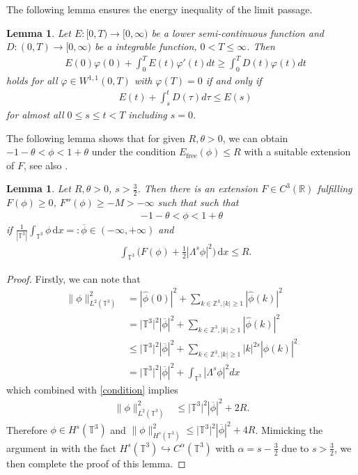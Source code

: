 \documentclass[reqno,a4paper,11pt]{amsart}
\theoremstyle{plain}
\newtheorem{lemma}[theorem]{Lemma}
\numberwithin{equation}{section}
\newcommand{\bb}[1]{\mathbb{#1}}
\newcommand{\bbt}{\bb{T}}
\renewcommand{\d}{\mathrm{d}}
\newcommand{\dx}{\d x}
\newcommand{\absm}[1]{\vert #1 \vert}
\begin{document}
The following lemma ensures the energy inequality of the limit passage.
\begin{lemma}\label{lem4}\cite{AH}
	Let $E:[0,T)\rightarrow[0,\infty)$ be a lower semi-continuous function and $D:(0,T)\rightarrow [0,\infty)$ be a integrable function, $0<T\leq\infty$. Then
	\begin{align*}
		&E(0)\varphi(0)+\int_0^{T}E(t)\varphi '(t)dt\geq \int_0^{T}D(t)\varphi(t)dt
	\end{align*}
	holds for all $\varphi\in W^{1,1}(0,T)$ with $\varphi(T)=0$ if and only if
	\begin{align*}
		&E(t)+\int_s^{t}D(\tau)d\tau\leq E(s)
	\end{align*}
	for almost all $0\leq s\leq t<T$ including $s=0$.
\end{lemma}
The following lemma shows that for given $R,\theta>0$, we can obtain $-1-\theta<\phi<1+\theta$ under the condition $E_{\text{free}}(\phi)\leq R$ with a suitable extension of $F$, see also \cite{AH}.
\begin{lemma}\label{lem2}
	Let $R,\theta>0$, $s>\frac{3}{2}$. Then there is an extension $F\in C^{3}(\mathbb{R})$ fulfilling $F(\phi)\geq0$, $F''(\phi)\geq -M> -\infty$ such that such that 
	\begin{align*}
		-1-\theta<\phi<1+\theta
	\end{align*}
	if $ \frac{1}{|\bbt^3|} \int_{\bbt^3} \phi \,\dx=:\overline{\phi} \in(-\infty,+\infty)$  and 
	\begin{align}
		& \int_{\mathbb{T}^{3}}\Big( F(\phi)+\frac{1}{2}|\Lambda^{s} \phi|^2\Big)\, \mathrm dx\leq R.\label{condition}
	\end{align}
\end{lemma}
\begin{proof}
	Firstly, we can note  that
	\begin{align*} \|\phi\|^2_{L^{2}(\mathbb{T}^{3})}&=|\hat{\phi}(0)|^2+\sum_{k\in \mathbb{Z}^3,|k|\geq 1}|\hat{\phi}(k)|^2
		\\&=\absm{\bbt^3}^2|\overline{\phi}|^{2}+\sum_{k\in \mathbb{Z}^3,|k|\geq 1}|\hat{\phi}(k)|^2
		\\&\leq \absm{\bbt^3}^2|\overline{\phi}|^{2}+\sum_{k\in \mathbb{Z}^3,|k|\geq 1}|k|^{2s}|\hat{\phi}(k)|^2
		\\&= \absm{\bbt^3}^2|\overline{\phi}|^{2}+\int_{\mathbb{T}^{3}}|\Lambda^{s} \phi|^2dx
	\end{align*}
	which combined with \eqref{condition} implies
	\begin{align*}
		\|\phi\|^2_{L^{2}(\mathbb{T}^{3})}&\leq\absm{\bbt^3}^2|\overline{\phi}|^{2}+2R.
	\end{align*}
	Therefore $\phi\in H^{s}(\mathbb{T}^{3})$ and $\|\phi\|^2_{H^{s}(\mathbb{T}^{3})}\leq\absm{\bbt^3}^2|\overline{\phi}|^{2}+4R$. Mimicking the argument in \cite[Lemma 2.3]{AH} with the fact $H^{s}(\mathbb{T}^{3})\hookrightarrow C^{\alpha}(\mathbb{T}^{3})$ with $\alpha=s-\frac{3}{2}$ due to $s>\frac{3}{2}$, we then complete the proof of this lemma.
\end{proof}
\end{document}

